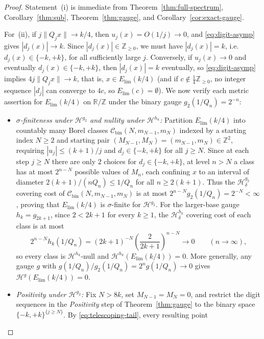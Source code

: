 \documentclass[11pt]{article}
\theoremstyle{definition}
\theoremstyle{remark}
\newcommand{\R}{\mathbb{R}}
\newcommand{\Z}{\mathbb{Z}}
\begin{document}
\begin{proof}
Statement~(i) is immediate from Theorem~\ref{thm:full-spectrum},
Corollary~\ref{thm:sub}, Theorem~\ref{thm:gauge}, and
Corollary~\ref{cor:exact-gauge}.

For~(ii), if $j\|Q_jx\|\to k/4$, then $u_j(x)=O(1/j)\to0$, and
\eqref{eq:digit-asymp} gives $|d_j(x)|\to k$. Since $|d_j(x)|\in\Z_{\ge0}$, we
must have $|d_j(x)|=k$, i.e.\ $d_j(x)\in\{-k,+k\}$, for all sufficiently large
$j$. Conversely, if $u_j(x)\to0$ and eventually $d_j(x)\in\{-k,+k\}$, then
$|d_j(x)|=k$ eventually, so \eqref{eq:digit-asymp} implies $4j\|Q_jx\|\to k$,
that is, $x\in E_{\mathrm{lim}}(k/4)$ (and if $c\notin\frac14\Z_{\ge0}$, no
integer sequence $|d_j|$ can converge to $4c$, so $E_{\mathrm{lim}}(c)=\emptyset$).
We now verify each metric assertion for $E_{\mathrm{lim}}(k/4)$ on $\R/\Z$ under
the binary gauge $g_2(1/Q_n)=2^{-n}$:
\begin{itemize}[leftmargin=1.8em]
\item \emph{$\sigma$-finiteness under $\mathcal H^{g_2}$ and nullity under $\mathcal H^{h_k}$:}
Partition $E_{\mathrm{lim}}(k/4)$ into countably many Borel classes
$\mathcal C_{\mathrm{bin}}(N,m_{N-1},m_N)$ indexed by a starting index $N\ge2$
and starting pair $(M_{N-1},M_N)=(m_{N-1},m_N)\in\Z^2$, requiring
$|u_j|\le(k+1)/j$ and $d_j\in\{-k,+k\}$ for all $j\ge N$. Since at each step
$j\ge N$ there are only $2$ choices for $d_j\in\{-k,+k\}$, at level $n>N$ a
class has at most $2^{n-N}$ possible values of $M_n$, each confining $x$ to an
interval of diameter $2(k+1)/(nQ_n)\le1/Q_n$ for all $n\ge2(k+1)$. Thus the
$\mathcal H_\delta^{g_2}$ covering cost of $\mathcal C_{\mathrm{bin}}(N,m_{N-1},m_N)$
is at most $2^{n-N}g_2(1/Q_n)=2^{-N}<\infty$, proving that
$E_{\mathrm{lim}}(k/4)$ is $\sigma$-finite for $\mathcal H^{g_2}$. For the
larger-base gauge $h_k=g_{2k+1}$, since $2<2k+1$ for every $k\ge1$, the
$\mathcal H_\delta^{h_k}$ covering cost of each class is at most
\[
2^{n-N}h_k(1/Q_n)=(2k+1)^{-N}\left(\frac{2}{2k+1}\right)^{n-N}\longrightarrow0
\qquad(n\to\infty),
\]
so every class is $\mathcal H^{h_k}$-null and
$\mathcal H^{h_k}(E_{\mathrm{lim}}(k/4))=0$. More generally, any gauge $g$ with
$g(1/Q_n)/g_2(1/Q_n)=2^ng(1/Q_n)\to0$ gives
$\mathcal H^g(E_{\mathrm{lim}}(k/4))=0$.
\item \emph{Positivity under $\mathcal H^{g_2}$:}
Fix $N>8k$, set $M_{N-1}=M_N=0$, and restrict the digit sequences in the
\emph{Positivity} step of Theorem~\ref{thm:gauge} to the binary space
$\{-k,+k\}^{\{j\ge N\}}$. By \eqref{eq:telescoping-tail}, every resulting point

\end{itemize}
\end{proof}
\end{document}
